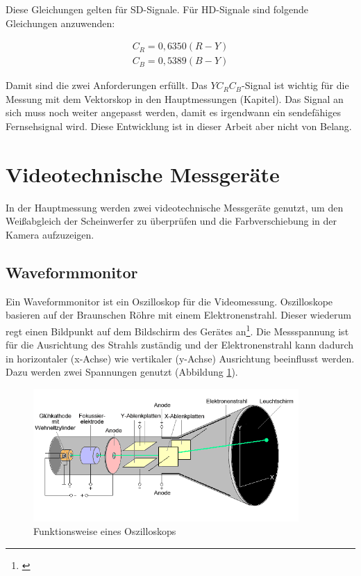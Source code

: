 \noindent Diese Gleichungen gelten für SD-Signale. Für HD-Signale sind folgende Gleichungen anzuwenden:

\begin{eqnarray}\label{gl_ycrcb3}
	C_{R}=0,6350(R-Y)\\
	C_{B}=0,5389(B-Y)
\end{eqnarray}


\noindent Damit sind die zwei Anforderungen erfüllt. Das $YC_{R}C_{B}$-Signal ist wichtig für die Messung mit dem Vektorskop in den Hauptmessungen (Kapitel). Das Signal an sich muss noch weiter angepasst werden, damit es irgendwann ein sendefähiges Fernsehsignal wird. Diese Entwicklung ist in dieser Arbeit aber nicht von Belang.


\newpage
\section{Videotechnische Messgeräte}
In der Hauptmessung werden zwei videotechnische Messgeräte genutzt, um den Weißabgleich der Scheinwerfer zu überprüfen und die Farbverschiebung in der Kamera aufzuzeigen.

\subsection{Waveformmonitor}
\label{sec_wmf}
Ein Waveformmonitor ist ein Oszilloskop für die Videomessung. Oszilloskope basieren auf der Braunschen Röhre mit einem Elektronenstrahl. Dieser wiederum regt einen Bildpunkt auf dem Bildschirm des Gerätes an\footnote{\cite[109]{schmidt}}.
Die Messspannung ist für die Ausrichtung des Strahls zuständig und der Elektronenstrahl kann dadurch in horizontaler (x-Achse) wie vertikaler (y-Achse) Ausrichtung beeinflusst werden. Dazu werden zwei Spannungen genutzt (Abbildung \ref{b_oszilloskop}).

\begin{figure}[H]     %
\centering
\includegraphics[width=0.9\textwidth]{bilder/oszilloskop} 
\caption {Funktionsweise eines Oszilloskops\protect\footnotemark}\label{b_oszilloskop}
\end{figure}

